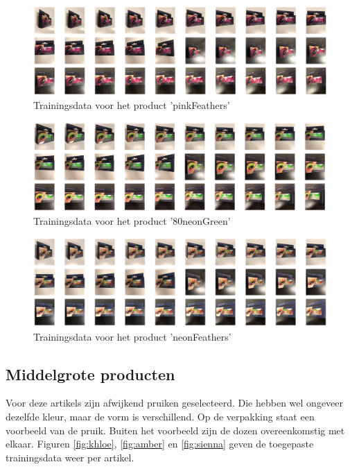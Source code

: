 \begin{figure}[!ht]
    \centering
        \includegraphics[width=1\textwidth]{img/pinkFeathers.png}
    \caption{Trainingsdata voor het product 'pinkFeathers'}
    \label{fig:pinkFeathers}
  \end{figure}

  \begin{figure}[!ht]
    \centering
        \includegraphics[width=1\textwidth]{img/80neonGreen.png}
    \caption{Trainingsdata voor het product '80neonGreen'}
    \label{fig:80neonGreen}
  \end{figure}

  \begin{figure}[h!]
    \centering
        \includegraphics[width=1\textwidth]{img/neonFeathers.png}
    \caption{Trainingsdata voor het product 'neonFeathers'}
    \label{fig:neonFeathers}
  \end{figure}

  \subsection{Middelgrote producten}
\label{ssec:Middelgrote producten}

Voor deze artikels zijn afwijkend pruiken geselecteerd. Die hebben wel ongeveer dezelfde kleur, maar de vorm is verschillend. Op de verpakking staat een voorbeeld van de pruik. Buiten het voorbeeld zijn de dozen overeenkomstig met elkaar. 
Figuren \ref{fig:khloe}, \ref{fig:amber} en \ref{fig:sienna} geven de toegepaste trainingsdata weer per artikel.

